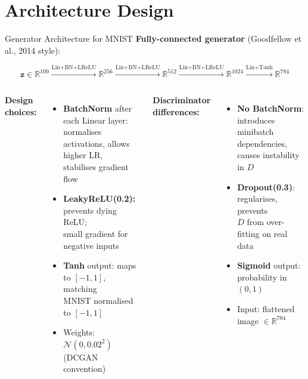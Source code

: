 \documentclass[aspectratio=169,11pt]{beamer}
\newcommand{\R}{\mathbb{R}}
\newcommand{\bz}{\bm{z}}
\begin{document}
\section{Architecture Design}

\begin{frame}{Generator Architecture for MNIST}
  \textbf{Fully-connected generator} (Goodfellow et al., 2014 style):

  \small
  \[
    \bz\!\in\!\R^{100}
    \xrightarrow{\text{Lin+BN+LReLU}}
    \R^{256}
    \xrightarrow{\text{Lin+BN+LReLU}}
    \R^{512}
    \xrightarrow{\text{Lin+BN+LReLU}}
    \R^{1024}
    \xrightarrow{\text{Lin+Tanh}}
    \R^{784}
  \]
  \normalsize

  \medskip
  \begin{columns}[T]
      \textbf{Design choices:}
      \begin{itemize}
        \item \textbf{BatchNorm} after each Linear layer:\\
              normalises activations, allows higher LR,\\
              stabilises gradient flow
        \item \textbf{LeakyReLU(0.2):} prevents dying ReLU;\\
              small gradient for negative inputs
        \item \textbf{Tanh} output: maps to $[-1,1]$, matching\\
              MNIST normalised to $[-1,1]$
        \item Weights: $\mathcal{N}(0,0.02^2)$ (DCGAN convention)
      \end{itemize}

      \textbf{Discriminator differences:}
      \begin{itemize}
        \item \textbf{No BatchNorm}: introduces minibatch\\
              dependencies, causes instability in $D$
        \item \textbf{Dropout(0.3)}: regularises, prevents\\
              $D$ from over-fitting on real data
        \item \textbf{Sigmoid} output: probability in $(0,1)$
        \item Input: flattened image $\in\R^{784}$
      \end{itemize}
  \end{columns}
\end{frame}
\end{document}
